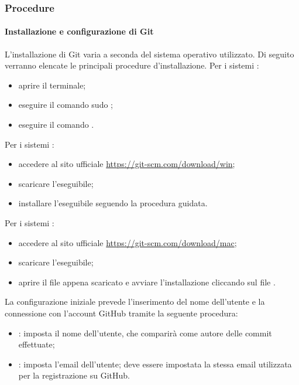 	  \subsubsection{Procedure}
	  \paragraph{Installazione e configurazione di Git}
	  L'installazione di Git varia a seconda del sistema operativo utilizzato. Di seguito verranno elencate le principali procedure d'installazione.
	  \newline \newline
	  Per i sistemi :
	  \begin{itemize}
	  	\item aprire il terminale;
	  	\item eseguire il comando sudo ;
	  	\item eseguire il comando .
	  \end{itemize}
	  Per i sistemi :
	  \begin{itemize}
	  	\item accedere al sito ufficiale \url{https://git-scm.com/download/win};
	  	\item scaricare l'eseguibile;
	  	\item installare l'eseguibile seguendo la procedura guidata.
	  \end{itemize}
	  Per i sistemi :
	  \begin{itemize}
	  	\item accedere al sito ufficiale \url{https://git-scm.com/download/mac};
	  	\item scaricare l'eseguibile;
	  	\item aprire il file appena scaricato e avviare l'installazione cliccando sul file .
	  \end{itemize}
	  La configurazione iniziale prevede l'inserimento del nome dell'utente e la connessione con l'account GitHub tramite la seguente procedura:
	  \begin{itemize}
	  	\item {}: imposta il nome dell'utente, che comparirà come autore delle commit effettuate;
	  	\item {}: imposta l'email dell'utente; deve essere impostata la stessa email utilizzata per la registrazione su GitHub.
	  \end{itemize}
